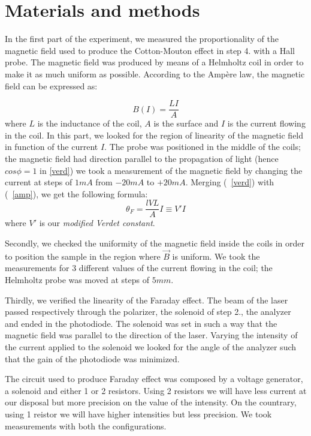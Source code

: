 \documentclass[11pt,a4paper]{article}
\begin{document}
\section{Materials and methods}\label{mm}
In the first part of the experiment, we measured the proportionality of the magnetic field used to produce the Cotton-Mouton effect in step 4. with a Hall probe. The magnetic field was produced by means of a Helmholtz coil in order to make it as much uniform as possible. According to the Ampère law, the magnetic field can be expressed as:

\begin{equation}
B(I)=\frac{LI}{A}\label{amp}
\end{equation}
where $L$ is the inductance of the coil, $A$ is the surface and $I$ is the current flowing in the coil. In this part, we looked for the region of linearity of the magnetic field in function of the current $I$. The probe was positioned in the middle of the coils; the magnetic field had direction parallel to the propagation of light (hence $cos\phi=1$ in \ref{verd}) we took a measurement of the magnetic field by changing the current at steps of $1mA$ from $-20mA$ to $+20mA$. Merging (~\ref{verd}) with (~\ref{amp}), we get the following formula:
\begin{equation}
\theta_F=\frac{lVL}{A}I\equiv V'I
\end{equation} where $V'$ is our \emph{modified Verdet constant}.

Secondly, we checked the uniformity of the magnetic field inside the coils in order to position the sample in the region where $\vec{B}$ is uniform. We took the measurements for 3 different values of the current flowing in the coil; the Helmholtz probe was moved at steps of $5mm$.

Thirdly, we verified the linearity of the Faraday effect. The beam of the laser passed respectively through the polarizer, the solenoid of step 2., the analyzer and ended in the photodiode. The solenoid was set in such a way that the magnetic field was parallel to the direction of the laser. Varying the intensity of the current applied to the solenoid we looked for the angle of the analyzer such that the gain of the photodiode was minimized.

The circuit used to produce Faraday effect was composed by a voltage generator, a solenoid and either 1 or 2 resistors. Using 2 resistors we will have less current at our disposal but more precision on the value of the intensity. On the countrary, using 1 reistor we will have higher intensities but less precision. We took measurements with both the configurations.
\end{document}
